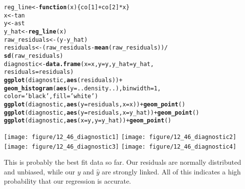 \documentclass[10pt]{article}\usepackage[]{graphicx}\usepackage[]{xcolor}
\makeatletter
\newcommand{\hlnum}[1]{\textcolor[rgb]{0.686,0.059,0.569}{#1}}%
\newcommand{\hlstr}[1]{\textcolor[rgb]{0.192,0.494,0.8}{#1}}%
\newcommand{\hlopt}[1]{\textcolor[rgb]{0,0,0}{#1}}%
\newcommand{\hlstd}[1]{\textcolor[rgb]{0.345,0.345,0.345}{#1}}%
\newcommand{\hlkwa}[1]{\textcolor[rgb]{0.161,0.373,0.58}{\textbf{#1}}}%
\newcommand{\hlkwb}[1]{\textcolor[rgb]{0.69,0.353,0.396}{#1}}%
\newcommand{\hlkwc}[1]{\textcolor[rgb]{0.333,0.667,0.333}{#1}}%
\newcommand{\hlkwd}[1]{\textcolor[rgb]{0.737,0.353,0.396}{\textbf{#1}}}%
\newenvironment{kframe}{%
 \def\at@end@of@kframe{}%
 \ifinner\ifhmode%
  \def\at@end@of@kframe{\end{minipage}}%
  \begin{minipage}{\columnwidth}%
 \fi\fi%
 \def\FrameCommand##1{\hskip\@totalleftmargin \hskip-\fboxsep
 \colorbox{shadecolor}{##1}\hskip-\fboxsep
     \hskip-\linewidth \hskip-\@totalleftmargin \hskip\columnwidth}%
 \MakeFramed {\advance\hsize-\width
   \@totalleftmargin\z@ \linewidth\hsize
   \@setminipage}}%
 {\par\unskip\endMakeFramed%
 \at@end@of@kframe}
\newenvironment{knitrout}{}{} %
\makeatother
\begin{document}
\begin{easylist}[enumerate]
\begin{knitrout}
\color{fgcolor}\begin{kframe}
\begin{alltt}
         \hlstd{reg_line} \hlkwb{<-} \hlkwa{function}\hlstd{(}\hlkwc{x}\hlstd{) \{ co[}\hlnum{1}\hlstd{]} \hlopt{+} \hlstd{co[}\hlnum{2}\hlstd{]} \hlopt{*} \hlstd{x \}}
         \hlstd{x} \hlkwb{<-} \hlstd{tan}
         \hlstd{y} \hlkwb{<-} \hlstd{ast}
         \hlstd{y_hat} \hlkwb{<-} \hlkwd{reg_line}\hlstd{(x)}
         \hlstd{raw_residuals} \hlkwb{<-} \hlstd{(y} \hlopt{-} \hlstd{y_hat)}
         \hlstd{residuals} \hlkwb{<-} \hlstd{(raw_residuals} \hlopt{-} \hlkwd{mean}\hlstd{(raw_residuals))} \hlopt{/}
                         \hlkwd{sd}\hlstd{(raw_residuals)}
         \hlstd{diagnostic} \hlkwb{<-} \hlkwd{data.frame}\hlstd{(}\hlkwc{x}\hlstd{=x,} \hlkwc{y}\hlstd{=y,} \hlkwc{y_hat}\hlstd{=y_hat,}
                                  \hlkwc{residuals}\hlstd{=residuals)}
         \hlkwd{ggplot}\hlstd{(diagnostic,} \hlkwd{aes}\hlstd{(residuals))} \hlopt{+}
             \hlkwd{geom_histogram}\hlstd{(}\hlkwd{aes}\hlstd{(}\hlkwc{y}\hlstd{=..density..),} \hlkwc{binwidth}\hlstd{=}\hlnum{1}\hlstd{,}
                            \hlkwc{color}\hlstd{=}\hlstr{'black'}\hlstd{,} \hlkwc{fill}\hlstd{=}\hlstr{'white'}\hlstd{)}
         \hlkwd{ggplot}\hlstd{(diagnostic,} \hlkwd{aes}\hlstd{(}\hlkwc{y}\hlstd{=residuals,} \hlkwc{x}\hlstd{=x))} \hlopt{+} \hlkwd{geom_point}\hlstd{()}
         \hlkwd{ggplot}\hlstd{(diagnostic,} \hlkwd{aes}\hlstd{(}\hlkwc{y}\hlstd{=residuals,} \hlkwc{x}\hlstd{=y_hat))} \hlopt{+} \hlkwd{geom_point}\hlstd{()}
         \hlkwd{ggplot}\hlstd{(diagnostic,} \hlkwd{aes}\hlstd{(}\hlkwc{x}\hlstd{=y,} \hlkwc{y}\hlstd{=y_hat))} \hlopt{+} \hlkwd{geom_point}\hlstd{()}
\end{alltt}
\end{kframe}

{\centering \texttt{[image: figure/12\_46\_diagnostic1]} 
\texttt{[image: figure/12\_46\_diagnostic2]} 
\texttt{[image: figure/12\_46\_diagnostic3]} 
\texttt{[image: figure/12\_46\_diagnostic4]} 

}



\end{knitrout}


    This is probably the best fit data so far. Our residuals are normally distributed and unbiased, while our $y$ and
    $\hat{y}$ are strongly linked. All of this indicates a high probability that our regression is accurate.


\end{easylist}
\end{document}
